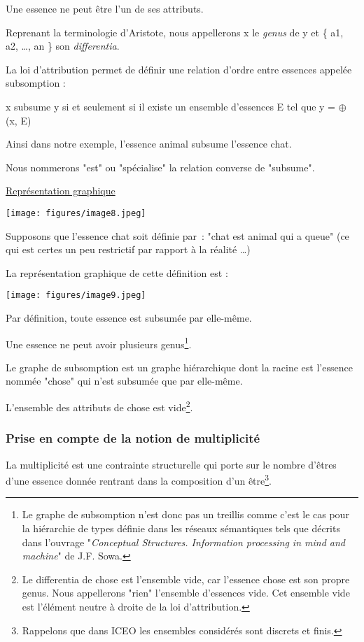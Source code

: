 \documentclass[a4paper, 12pt, openright, french]{book}
\begin{document}
Une essence ne peut être l'un de ses attributs.

Reprenant la terminologie d'Aristote, nous appellerons x
le \emph{genus} de y et \{ a1, a2, \ldots, an \} son \emph{differentia}.

La loi d'attribution permet de définir une relation
d'ordre entre essences appelée subsomption :

x subsume y si et seulement si il existe un ensemble
d'essences E tel que y = $\oplus$ (x, E)

Ainsi dans notre exemple, l'essence animal subsume
l'essence chat.

Nous nommerons "est" ou "spécialise" la relation converse de "subsume".

\uline{Représentation graphique}

\texttt{[image: figures/image8.jpeg]}

Supposons que l'essence chat soit définie par~: "chat
est animal qui a queue" (ce qui est certes un peu restrictif par rapport à la réalité \ldots)

La représentation graphique de cette définition est :

\texttt{[image: figures/image9.jpeg]}

Par définition, toute essence est subsumée par elle-même.

Une essence ne peut avoir plusieurs genus\footnote{Le graphe de subsomption n'est donc
	pas un treillis comme c'est le cas pour la hiérarchie de
	types définie dans les réseaux sémantiques tels que décrits dans
	l'ouvrage "\emph{Conceptual Structures. Information
		processing in mind and machine}" de J.F. Sowa.}.

Le graphe de subsomption est un graphe hiérarchique dont la racine est
l'essence nommée "chose" qui n'est
subsumée que par elle-même.

L'ensemble des attributs de chose est
vide\footnote{Le differentia de chose est
	l'ensemble vide, car l'essence chose est
	son propre genus. Nous appellerons "rien" l'ensemble
	d'essences vide. Cet ensemble vide est
	l'élément neutre à droite de la loi
	d'attribution.}.


\subsubsection{Prise en compte de la notion de multiplicité}

La multiplicité est une contrainte structurelle qui porte sur le nombre
d'êtres d'une essence donnée rentrant
dans la composition d'un être\footnote{Rappelons que dans ICEO les ensembles considérés sont discrets et finis.}.
\end{document}
